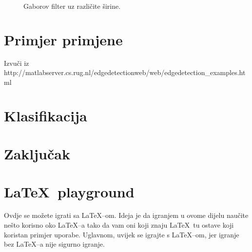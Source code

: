 \documentclass{article}
\begin{document}
\begin{figure}[htb]
  \centering
  \hspace{50pt}
  \caption{Gaborov filter uz različite širine.}
  \label{fig:filter-bandwidths}
\end{figure}

\section{Primjer primjene}
Izvuči iz http://matlabserver.cs.rug.nl/edgedetectionweb/web/edgedetection\_examples.html

\section{Klasifikacija}

\section{Zaključak}




\newpage
\appendix
\section{\LaTeX~playground}
Ovdje se možete igrati sa \LaTeX--om. Ideja je da igranjem u ovome dijelu
naučite nešto korisno oko \LaTeX--a tako da vam oni koji znaju \LaTeX~tu ostave
koji koristan primjer uporabe. Uglavnom, uvijek se igrajte s \LaTeX--om, jer igranje bez \LaTeX--a nije sigurno igranje. 
\end{document}
